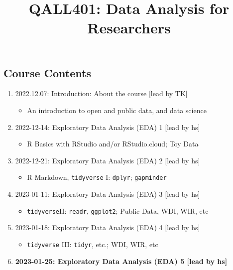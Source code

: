 \documentclass[
]{article}
\title{QALL401: Data Analysis for Researchers}
\author{}
\date{\vspace{-2.5em}}
\providecommand{\tightlist}{%
  \setlength{\itemsep}{0pt}\setlength{\parskip}{0pt}}
\begin{document}
\maketitle

\hypertarget{course-contents}{%
\subsection*{Course Contents}\label{course-contents}}

\begin{enumerate}
\def\labelenumi{\arabic{enumi}.}
\tightlist
\item
  2022.12.07: Introduction: About the course {[}lead by TK{]}

  \begin{itemize}
  \tightlist
  \item
    An introduction to open and public data, and data science
  \end{itemize}
\item
  2022-12-14: Exploratory Data Analysis (EDA) 1 {[}lead by hs{]}

  \begin{itemize}
  \tightlist
  \item
    R Basics with RStudio and/or RStudio.cloud; Toy Data
  \end{itemize}
\item
  2022-12-21: Exploratory Data Analysis (EDA) 2 {[}lead by hs{]}

  \begin{itemize}
  \tightlist
  \item
    R Markdown, \texttt{tidyverse} I: \texttt{dplyr}; \texttt{gapminder}
  \end{itemize}
\item
  2023-01-11: Exploratory Data Analysis (EDA) 3 {[}lead by hs{]}

  \begin{itemize}
  \tightlist
  \item
    \texttt{tidyverse}II: \texttt{readr}, \texttt{ggplot2}; Public Data,
    WDI, WIR, etc
  \end{itemize}
\item
  2023-01-18: Exploratory Data Analysis (EDA) 4 {[}lead by hs{]}

  \begin{itemize}
  \tightlist
  \item
    \texttt{tidyverse} III: \texttt{tidyr}, etc.; WDI, WIR, etc
  \end{itemize}
\item
  \textbf{2023-01-25: Exploratory Data Analysis (EDA) 5 {[}lead by hs{]}
  }


\end{enumerate}
\end{document}
